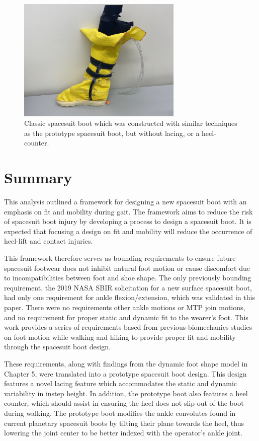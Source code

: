 \documentclass[defaultstyle,11pt]{comps}
\begin{document}
\begin{figure}
\hypertarget{fig:SA3-classic_boot}{%
\centering
\includegraphics[width=0.7\textwidth,height=\textheight]{../fig/SA3/Classic_Spaceboot.jpg}
\caption{Classic spacesuit boot which was constructed with similar techniques as the prototype spacesuit boot, but without lacing, or a heel-counter.}\label{fig:SA3-classic_boot}
}
\end{figure}

\hypertarget{summary-4}{%
\section{Summary}\label{summary-4}}

This analysis outlined a framework for designing a new spacesuit boot with an emphasis on fit and mobility during gait.
The framework aims to reduce the risk of spacesuit boot injury by developing a process to design a spacesuit boot.
It is expected that focusing a design on fit and mobility will reduce the occurrence of heel-lift and contact injuries.

This framework therefore serves as bounding requirements to ensure future spacesuit footwear does not inhibit natural foot motion or cause discomfort due to incompatibilities between foot and shoe shape.
The only previously bounding requirement, the 2019 NASA SBIR solicitation for a new surface spacesuit boot, had only one requirement for ankle flexion/extension, which was validated in this paper.
There were no requirements other ankle motions or MTP join motions, and no requirement for proper static and dynamic fit to the wearer's foot.
This work provides a series of requirements based from previous biomechanics studies on foot motion while walking and hiking to provide proper fit and mobility through the spacesuit boot design.

These requirements, along with findings from the dynamic foot shape model in Chapter 5, were translated into a prototype spacesuit boot design.
This design features a novel lacing feature which accommodates the static and dynamic variability in instep height.
In addition, the prototype boot also features a heel counter, which should assist in ensuring the heel does not slip out of the boot during walking.
The prototype boot modifies the ankle convolutes found in current planetary spacesuit boots by tilting their plane towards the heel, thus lowering the joint center to be better indexed with the operator's ankle joint.
\end{document}
